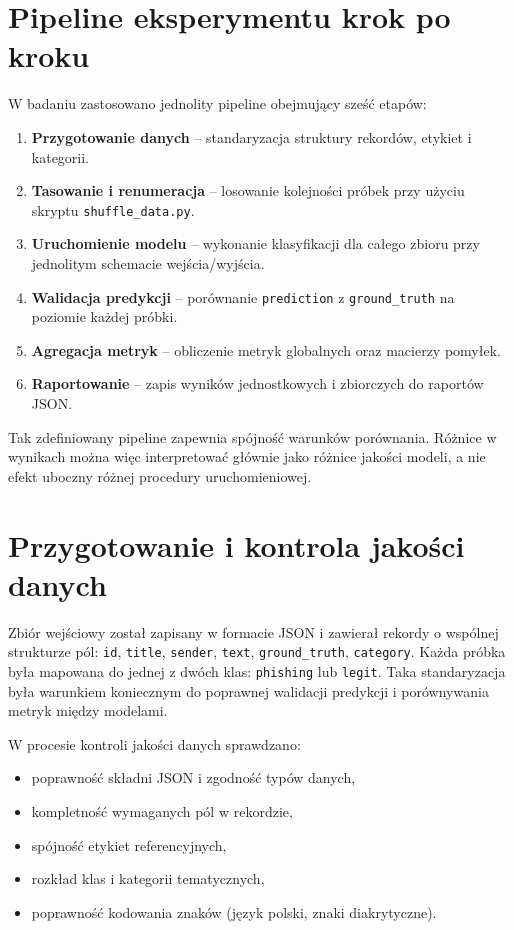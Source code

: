 \documentclass[12pt,a4paper,openany]{report}
\begin{document}
\section{Pipeline eksperymentu krok po kroku}

W badaniu zastosowano jednolity pipeline obejmujący sześć etapów:

\begin{enumerate}
    \item \textbf{Przygotowanie danych} -- standaryzacja struktury rekordów, etykiet i kategorii.
    \item \textbf{Tasowanie i renumeracja} -- losowanie kolejności próbek przy użyciu skryptu \texttt{shuffle\_data.py}.
    \item \textbf{Uruchomienie modelu} -- wykonanie klasyfikacji dla całego zbioru przy jednolitym schemacie wejścia/wyjścia.
    \item \textbf{Walidacja predykcji} -- porównanie \texttt{prediction} z \texttt{ground\_truth} na poziomie każdej próbki.
    \item \textbf{Agregacja metryk} -- obliczenie metryk globalnych oraz macierzy pomyłek.
    \item \textbf{Raportowanie} -- zapis wyników jednostkowych i zbiorczych do raportów JSON.
\end{enumerate}

Tak zdefiniowany pipeline zapewnia spójność warunków porównania. Różnice w wynikach można więc interpretować głównie jako różnice jakości modeli, a nie efekt uboczny różnej procedury uruchomieniowej.

\section{Przygotowanie i kontrola jakości danych}

Zbiór wejściowy został zapisany w formacie JSON i zawierał rekordy o wspólnej strukturze pól: \texttt{id}, \texttt{title}, \texttt{sender}, \texttt{text}, \texttt{ground\_truth}, \texttt{category}. Każda próbka była mapowana do jednej z dwóch klas: \texttt{phishing} lub \texttt{legit}. Taka standaryzacja była warunkiem koniecznym do poprawnej walidacji predykcji i porównywania metryk między modelami.

W procesie kontroli jakości danych sprawdzano:

\begin{itemize}
    \item poprawność składni JSON i zgodność typów danych,
    \item kompletność wymaganych pól w rekordzie,
    \item spójność etykiet referencyjnych,
    \item rozkład klas i kategorii tematycznych,
    \item poprawność kodowania znaków (język polski, znaki diakrytyczne).
\end{itemize}
\end{document}
